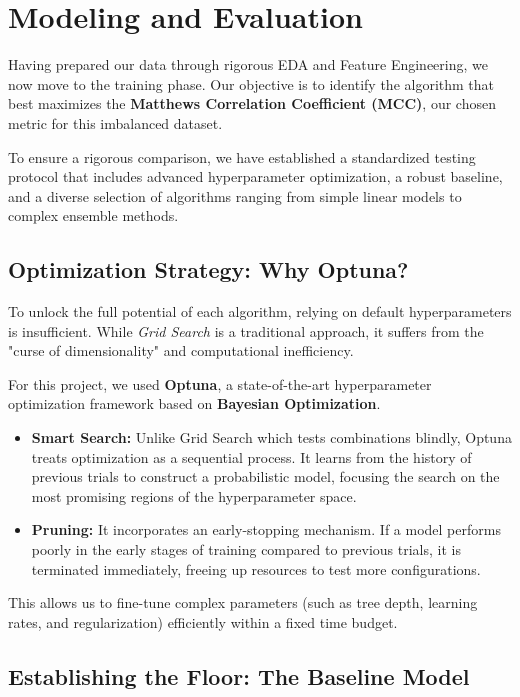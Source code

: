 \thispagestyle{plain}

\chapter{Modeling and Evaluation}
\label{cp:mae}

Having prepared our data through rigorous EDA and Feature Engineering, we now move to the training phase. Our objective is to identify
the algorithm that best maximizes the \textbf{Matthews Correlation Coefficient (MCC)}, our chosen metric for this imbalanced dataset.

To ensure a rigorous comparison, we have established a standardized testing protocol that includes advanced hyperparameter optimization,
a robust baseline, and a diverse selection of algorithms ranging from simple linear models to complex ensemble methods.

\section{Optimization Strategy: Why Optuna?}

To unlock the full potential of each algorithm, relying on default hyperparameters is insufficient. While \textit{Grid Search}
is a traditional approach, it suffers from the "curse of dimensionality" and computational inefficiency.

For this project, we used \textbf{Optuna}, a state-of-the-art hyperparameter optimization framework based on \textbf{Bayesian Optimization}.
\begin{itemize}
    \item \textbf{Smart Search:} Unlike Grid Search which tests combinations blindly, Optuna treats optimization as a sequential process.
    It learns from the history of previous trials to construct a probabilistic model, focusing the search on the most promising regions of the
    hyperparameter space.
    \item \textbf{Pruning:} It incorporates an early-stopping mechanism. If a model performs poorly in the early stages of training compared
    to previous trials, it is terminated immediately, freeing up resources to test more configurations.
\end{itemize}
This allows us to fine-tune complex parameters (such as tree depth, learning rates, and regularization) efficiently within a fixed time budget.

\section{Establishing the Floor: The Baseline Model}


